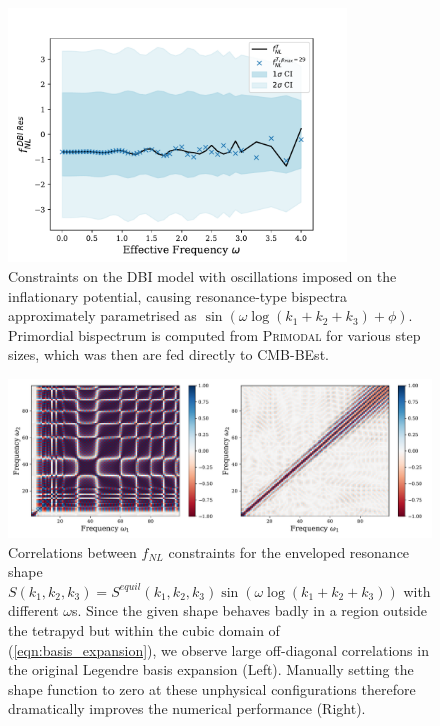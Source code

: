 \begin{figure}[htbp!] 
	\centering    
	\includegraphics[width=0.8\textwidth]{dbi_reso_scan_fNLs_new.pdf}
	\caption{Constraints on the DBI model with oscillations imposed on the inflationary potential, causing resonance-type bispectra approximately parametrised as $\sin(\omega \log(k_1+k_2+k_3) + \phi)$. Primordial bispectrum is computed from \textsc{Primodal} for various step sizes, which was then are fed directly to CMB-BEst.}
	\label{fig:dbi_resonance_scan}
\end{figure}

\begin{figure}[htbp!] 
	\centering    
	\includegraphics[width=\textwidth]{sinlog_equil_template_correlations_compare_decomp.pdf}
	\caption{Correlations between $f_{NL}$ constraints for the enveloped resonance shape $S(k_1,k_2,k_3) = S^{equil}(k_1,k_2,k_3) \sin(\omega \log(k_1+k_2+k_3))$ with different $\omega$s. Since the given shape behaves badly in a region outside the tetrapyd but within the cubic domain of (\ref{eqn:basis_expansion}), we observe large off-diagonal correlations in the original Legendre basis expansion (Left). Manually setting the shape function to zero at these unphysical configurations therefore dramatically improves the numerical performance (Right). }
	\label{fig:sinlog_equil_template_decomp_comparison}
\end{figure}







